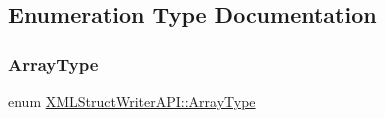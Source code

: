 \subsection{Enumeration Type Documentation}
\mbox{\label{namespaceXMLStructWriterAPI_a2017208be87c77a32bdc19ea2f14d032}} 
\subsubsection{\texorpdfstring{ArrayType}{ArrayType}\hspace{0.1cm}{\footnotesize\ttfamily [1/3]}}
{\footnotesize\ttfamily enum \mbox{\hyperlink{namespaceXMLStructWriterAPI_a2017208be87c77a32bdc19ea2f14d032}{X\+M\+L\+Struct\+Writer\+A\+P\+I\+::\+Array\+Type}}}

